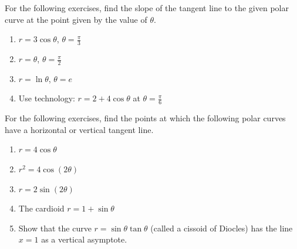 \documentclass{exercises}
\begin{document}
For the following exercises, find the slope of the tangent line to the given polar curve at the point given by the value of $\theta$.

\begin{enumerate}[resume]
\item $r=3\cos \theta$, $\theta=\frac{\pi}{3}$
\item $r=\theta$, $\theta=\frac{\pi}{2}$
\item $r=\ln \theta$, $\theta=e$
\item \techrequired Use technology: $r=2+4\cos \theta$ at $\theta=\frac{\pi}{6}$
\end{enumerate}

For the following exercises, find the points at which the following polar curves have a horizontal or vertical tangent line.

\begin{enumerate}[resume]
\item $r=4\cos \theta$
\item $r^{2}=4\cos(2\theta)$
\item $r=2\sin(2\theta)$
\item The cardioid $r=1+\sin \theta$
\item Show that the curve $r=\sin \theta \tan \theta$ (called a cissoid of Diocles) has the line $x=1$ as a vertical asymptote.
\end{enumerate}
\end{document}
